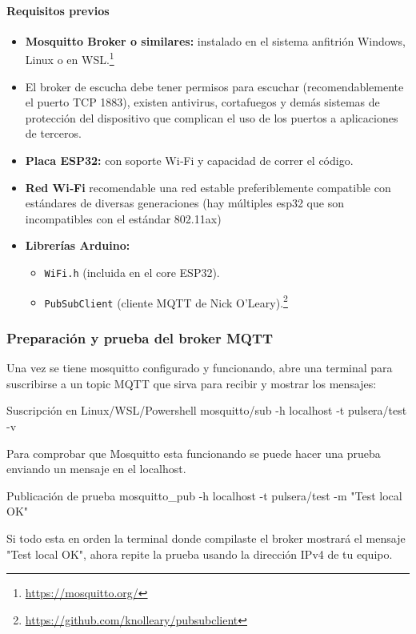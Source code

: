 \documentclass[12pt, a4paper]{article}
\begin{document}
\begin{umaappendices}
	\paragraph{Requisitos previos}
	\begin{itemize}
		\item \textbf{Mosquitto Broker o similares:} instalado en el sistema anfitrión Windows, Linux o en WSL.\footnote{\url{https://mosquitto.org/}} 
		\item El broker de escucha debe tener permisos para escuchar (recomendablemente el puerto TCP 1883), existen antivirus, cortafuegos y demás sistemas de protección del dispositivo que complican el uso de los puertos a aplicaciones de terceros.
		\item \textbf{Placa ESP32:} con soporte Wi‑Fi y capacidad de correr el código.
		\item \textbf{Red Wi‑Fi} recomendable una red estable preferiblemente compatible con estándares de diversas generaciones (hay múltiples esp32 que son incompatibles con el estándar 802.11ax)
		\item \textbf{Librerías Arduino:}
		\begin{itemize}
			\item \texttt{WiFi.h} (incluida en el core ESP32).
			\item \texttt{PubSubClient} (cliente MQTT de Nick O’Leary).\footnote{\url{https://github.com/knolleary/pubsubclient}}
		\end{itemize}
	\end{itemize}
	
	\subsubsection{Preparación y prueba del broker MQTT}
	Una vez se tiene mosquitto configurado y funcionando, abre una terminal para suscribirse a un topic MQTT que sirva para recibir y mostrar los mensajes:
	\begin{Terminal}{Suscripción en Linux/WSL/Powershell}
		mosquitto/sub -h localhost -t pulsera/test -v
	\end{Terminal}
	Para comprobar que Mosquitto esta funcionando se puede hacer una prueba enviando un mensaje en el localhost. 
	\begin{Terminal}{Publicación de prueba}
		mosquitto\_pub -h localhost -t pulsera/test -m "Test local OK"
	\end{Terminal}
	
	Si todo esta en orden la terminal donde compilaste el broker mostrará el mensaje "Test local OK", ahora repite la prueba usando la dirección IPv4 de tu equipo.

\end{umaappendices}
\end{document}
